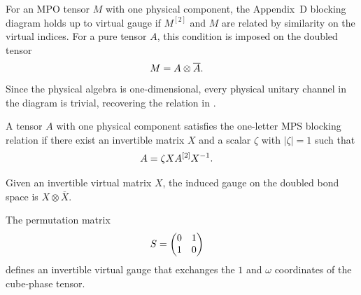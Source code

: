 \begin{definition}
    \label{def:one_letter_mpdo_virtual_gauge_rfp}
    \leanok
    For an MPO tensor $M$ with one physical component, the Appendix~D blocking
    diagram holds up to virtual gauge if $M^{[2]}$ and $M$ are related by
    similarity on the virtual indices. For a pure tensor $A$, this condition is
    imposed on the doubled tensor
    \begin{align}
        M & =A\otimes\overline A.
        \notag
    \end{align}
    Since the physical algebra is one-dimensional, every physical unitary
    channel in the diagram is trivial, recovering the relation in
    \cite[Appendix~D, lines~2100--2107]{Cirac2016MPDO_arXiv}.
\end{definition}

\begin{definition}
    \label{def:blocked_gauge_phase_fixed_point}
    \leanok
    A tensor $A$ with one physical component satisfies the one-letter MPS
    blocking relation if there exist an invertible matrix $X$ and a scalar
    $\zeta$ with $|\zeta|=1$ such that
    \begin{align}
        A & =\zeta X A^{[2]}X^{-1}.
        \notag
    \end{align}
\end{definition}

\begin{definition}
    \label{def:doubled_virtual_gauge}
    \leanok
    Given an invertible virtual matrix $X$, the induced gauge on the doubled
    bond space is $X\otimes\overline X$.
\end{definition}

\begin{definition}
    \label{def:cube_phase_swap_gauge}
    \leanok
    The permutation matrix
    \begin{align}
        S & =\begin{pmatrix}0&1\\1&0\end{pmatrix}
        \notag
    \end{align}
    defines an invertible virtual gauge that exchanges the $1$ and $\omega$
    coordinates of the cube-phase tensor.
\end{definition}

